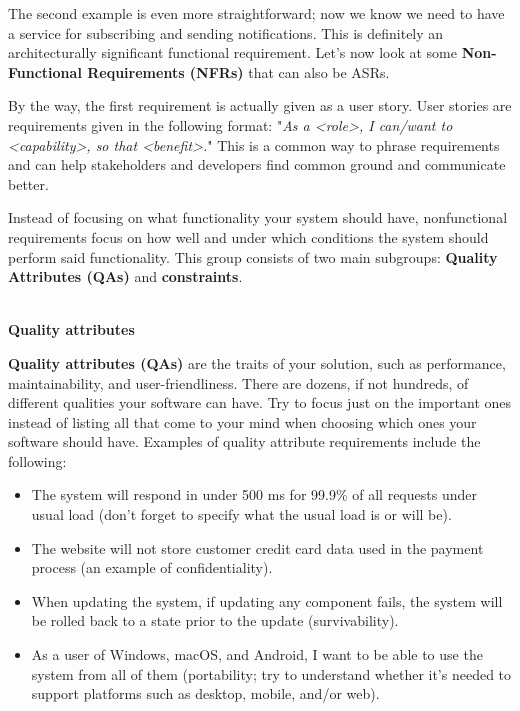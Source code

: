 The second example is even more straightforward; now we know we need to have a service for subscribing and sending notifications. This is definitely an architecturally significant functional requirement. Let's now look at some \textbf{Non-Functional Requirements (NFRs)} that can also be ASRs.

By the way, the first requirement is actually given as a user story. User stories are requirements given in the following format: "\textit{As a <role>, I can/want to <capability>, so that <benefit>.}" This is a common way to phrase requirements and can help stakeholders and developers find common ground and communicate better.



Instead of focusing on what functionality your system should have, nonfunctional requirements focus on how well and under which conditions the system should perform said functionality. This group consists of two main subgroups: \textbf{Quality Attributes (QAs)} and \textbf{constraints}.


\hspace*{\fill} \\ %
\noindent
\textbf{Quality attributes}

\textbf{Quality attributes (QAs)} are the traits of your solution, such as performance, maintainability, and user-friendliness. There are dozens, if not hundreds, of different qualities your software can have. Try to focus just on the important ones instead of listing all that come to your mind when choosing which ones your software should have. Examples of quality attribute requirements include the following:

\begin{itemize}
\item 
The system will respond in under 500 ms for 99.9\% of all requests under usual load (don't forget to specify what the usual load is or will be).

\item 
The website will not store customer credit card data used in the payment process (an example of confidentiality).

\item
When updating the system, if updating any component fails, the system will be rolled back to a state prior to the update (survivability).

 
\item 
As a user of Windows, macOS, and Android, I want to be able to use the system from all of them (portability; try to understand whether it's needed to support platforms such as desktop, mobile, and/or web).
\end{itemize}

